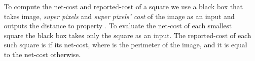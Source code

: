 \documentclass[11pt,english]{article}
\newtheorem{theorem}{Theorem}[section]
\newtheorem{definition}{Definition}[section]
\numberwithin{figure}{section}
\begin{document}
To compute the net-cost and reported-cost of a square we use a black box that takes   image, \emph{super pixels} and \emph{super pixels' cost} of the image as an input and outputs the distance to property . To evaluate the net-cost of each smallest square the black box takes only the square as an input. The reported-cost of each such square is  if its net-cost, where  is the perimeter of the image, and it is equal to the net-cost otherwise.
\fi

\begin{comment}
\subsection{Tester for Connectedness}\label{sec:connectedness-tester}
\begin{theorem}\label{thm:connectedness_tester}
There is a block-uniform (1-sided error) -tester for connectedness with sample and time complexity .
\end{theorem}
\begin{proof}
Observe that a tester can safely reject if it finds a small connected component and a black pixel outside it.
Our tester (Algorithm~\ref{alg:connectedness_tester-na}) looks for squares that contain small connected components, that is, are not border-connected, which we call witnesses. To find a witness, it samples -squares for  values of  which we call levels. In each subsequent level, the number of samples is doubled, but the side length of the squares is halved, i.e., the number of pixels in them is divided by 4.
If it finds a witness, it samples pixels to look for black pixels outside the witness.

\ifnum\full=1
For simplicity
of the analysis of the algorithm we assume\footnote {This assumption can be made
w.l.o.g.\ because if  for some , instead of the original image  we can consider a  image , which is equal to  on the corresponding coordinates and has white pixels everywhere else. Let
.
To -test  for connectedness, it suffices to -test  for connectedness.
The resulting tester for  has the desired query complexity because . If  for
some , to -test a property , it is sufficient to run an -test for  with  .}
\else
We can assume w.l.o.g.\
\fi
that 
and  are powers of
.
\begin{definition}[Levels, witnesses]
\label{def:Grid_pixels_and_squares_of_different_levels}
For  let  denote the length of level .
Pixels of the set  are called
\emph{grid pixels of level }, and squares in the set   are called \emph{squares of level} .
A square of level  which is not border-connected (see Definition~\ref{def:border_connectedness}) is called a \emph{witness}.
\end{definition}


\end{comment}
\end{document}
